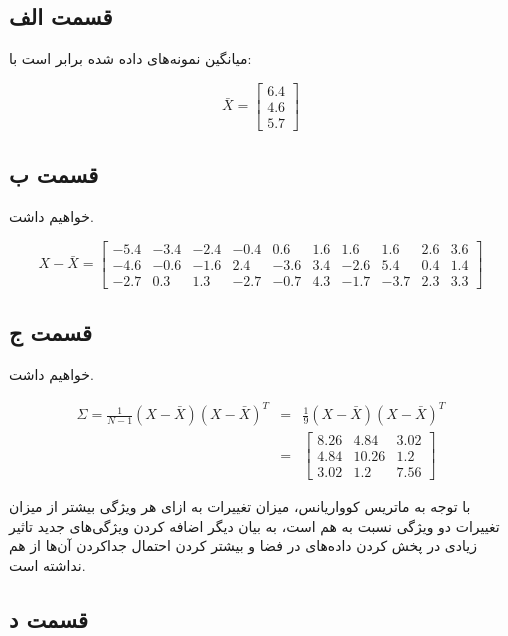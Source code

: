 \documentclass{article}
\begin{document}
\subsection*{قسمت الف}

میانگین نمونه‌های داده شده برابر است با:

$$\bar{X} = \begin{bmatrix}6.4\\ 4.6\\ 5.7\end{bmatrix}$$

\subsection*{قسمت ب}

خواهیم داشت.

$$X - \bar{X} = \begin{bmatrix}
-5.4 & -3.4 & -2.4 & -0.4 & 0.6 & 1.6 & 1.6 & 1.6 & 2.6 & 3.6 \\
-4.6 & -0.6 & -1.6 & 2.4 & -3.6 & 3.4 & -2.6 & 5.4 & 0.4 & 1.4 \\
-2.7 & 0.3 & 1.3 & -2.7 & -0.7 & 4.3 & -1.7 & -3.7 & 2.3 & 3.3
\end{bmatrix}$$

\subsection*{قسمت ج}

خواهیم داشت.

\begin{eqnarray*}
    \Sigma = \frac{1}{N-1} (X - \bar{X})(X - \bar{X})^T & = & \frac{1}{9} (X - \bar{X})(X - \bar{X})^T \\
    & = & \begin{bmatrix}
        8.26 & 4.84 & 3.02 \\
        4.84 & 10.26 & 1.2 \\
        3.02 & 1.2 & 7.56
    \end{bmatrix}
\end{eqnarray*}

با توجه به ماتریس کوواریانس، میزان تغییرات به ازای هر ویژگی بیشتر از میزان تغییرات دو ویژگی نسبت به هم
است، به بیان دیگر اضافه کردن ویژگی‌های جدید تاثیر زیادی در پخش کردن داده‌های در فضا و بیشتر کردن احتمال جداکردن آن‌ها
از هم نداشته است.

\subsection*{قسمت د}
\end{document}
